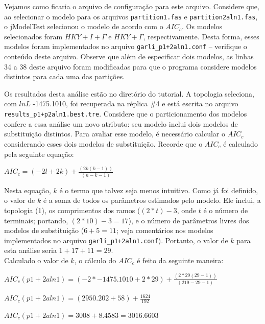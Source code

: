 \begin{refsection}
Vejamos como ficaria o arquivo de configuração para este arquivo. Considere que, ao selecionar o modelo para os arquivos \texttt{partition1.fas} e \texttt{partition2aln1.fas}, o jModelTest selecionou o modelo de acordo com o $AIC_{c}$. Os modelos selecionados foram $HKY+I+\Gamma$ e $HKY+\Gamma$, respectivamente. Desta forma, esses modelos foram implementados no arquivo \texttt{garli\_p1+2aln1.conf} -- verifique o conteúdo deste arquivo. Observe que além de especificar dois modelos, as linhas 34 a 38 deste arquivo foram modificadas para que o programa considere modelos distintos para cada uma das partições.

Os resultados desta análise estão no diretório do tutorial. A topologia seleciona, com $lnL$ -1475.1010, foi recuperada na réplica \#4 e está escrita no arquivo \texttt{results\_p1+p2aln1.best.tre}. Considere que o particionamento dos modelos confere a essa análise um novo atributo: seu modelo inclui dois modelos de substituição distintos. Para avaliar esse modelo, é necessário calcular o $AIC_{c}$ considerando esses dois modelos de substituição. Recorde que o $AIC_{c}$ é calculado pela seguinte equação:\\

\begin{center}
$AIC_{c} = (-2l + 2k) + \frac{(2k(k-1))}{(n-k-1)}$
\end{center}

Nesta equação, $k$ é o termo que talvez seja menos intuitivo. Como já foi definido, o valor de $k$ é a soma de todos os parâmetros estimados pelo modelo. Ele inclui, a topologia (1), os comprimentos dos ramos ($(2*t)-3$, onde $t$ é o número de terminais; portando, $(2*10)-3 = 17$), e o número de parâmetros livres dos modelos de substituição ($6+5 = 11$; veja comentários nos modelos implementados no arquivo \texttt{garli\_p1+2aln1.conf}). Portanto, o valor de $k$ para esta análise seria $1+17+11 = 29$.\\

Calculado o valor de $k$, o cálculo do $AIC_{c}$ é feito da seguinte maneira:

\begin{center}
$AIC_{c}(p1+2aln1) = (-2*-1475.1010 + 2*29) + \frac{(2*29(29-1))}{(219-29-1)}$
\end{center}

\begin{center}
$AIC_{c}(p1+2aln1) = (2950.202 + 58) + \frac{1624}{192}$
\end{center}

\begin{center}
$AIC_{c}(p1+2aln1) = 3008 + 8.4583 = 3016.6603$\\
\end{center}



\end{refsection}

